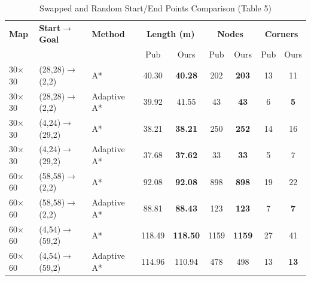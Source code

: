 \documentclass[conference]{IEEEtran}
\begin{document}
\begin{enumerate}
\begin{table}[htbp]
\caption{Swapped and Random Start/End Points Comparison (Table 5)}
\label{tab:startend}
\centering
\scriptsize
\setlength{\tabcolsep}{2.8pt}
\begin{tabular}{lllcccccc}
\toprule
\textbf{Map} & \textbf{Start$\to$Goal} & \textbf{Method} & \multicolumn{2}{c}{\textbf{Length (m)}} & \multicolumn{2}{c}{\textbf{Nodes}} & \multicolumn{2}{c}{\textbf{Corners}} \\
 & & & Pub & Ours & Pub & Ours & Pub & Ours \\
\midrule
30$\times$30 & (28,28)$\to$(2,2) & A* & 40.30 & \textbf{40.28} & 202 & \textbf{203} & 13 & 11 \\
30$\times$30 & (28,28)$\to$(2,2) & Adaptive A* & 39.92 & 41.55 & 43 & \textbf{43} & 6 & \textbf{5} \\
30$\times$30 & (4,24)$\to$(29,2) & A* & 38.21 & \textbf{38.21} & 250 & \textbf{252} & 14 & 16 \\
30$\times$30 & (4,24)$\to$(29,2) & Adaptive A* & 37.68 & \textbf{37.62} & 33 & \textbf{33} & 5 & 7 \\
\midrule
60$\times$60 & (58,58)$\to$(2,2) & A* & 92.08 & \textbf{92.08} & 898 & \textbf{898} & 19 & 22 \\
60$\times$60 & (58,58)$\to$(2,2) & Adaptive A* & 88.81 & \textbf{88.43} & 123 & \textbf{123} & 7 & \textbf{7} \\
60$\times$60 & (4,54)$\to$(59,2) & A* & 118.49 & \textbf{118.50} & 1159 & \textbf{1159} & 27 & 41 \\
60$\times$60 & (4,54)$\to$(59,2) & Adaptive A* & 114.96 & 110.94 & 478 & 498 & 13 & \textbf{13} \\
\bottomrule
\end{tabular}
\end{table}


\end{enumerate}
\end{document}
